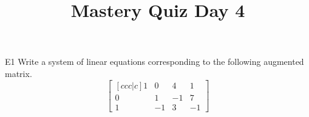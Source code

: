 \documentclass{sbgLAquiz}
\title{Mastery Quiz Day 4 }
\begin{document}
\begin{problem}{E1}
Write a system of linear equations corresponding to the following
augmented matrix.
\[
\begin{bmatrix}[ccc|c]
1 & 0 & 4 & 1 \\
0 & 1 & -1 & 7 \\
1 & -1 & 3 & -1
\end{bmatrix}
\]
\end{problem}
\end{document}

